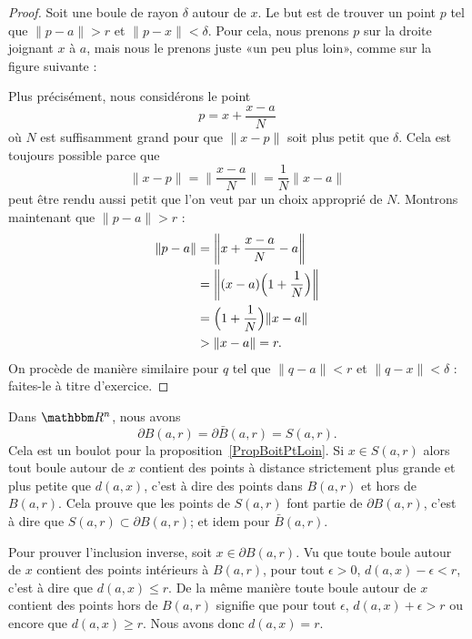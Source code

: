 \begin{proof}
	Soit une boule de rayon $\delta$ autour de $x$. Le but est de trouver un point $p$ tel que $\|p - a \|>r$ et $\|p - x \|<\delta$. Pour cela, nous prenons $p$ sur la droite joignant $x$ à $a$, mais nous le prenons juste «un peu plus loin», comme sur la figure suivante :

    \begin{center}
       
    \end{center}

   Plus précisément, nous considérons le point
	\begin{equation}
		p = x+\frac{ x - a }{ N }
	\end{equation}
	où \( N \) est suffisamment grand pour que \( \|x - p \| \) soit plus petit que \(\delta\). Cela est toujours possible parce que
	\begin{equation}
          \|x - p \| =  \biggl\|\frac {x - a} N \biggr\| = \frac 1 N \| x - a \|
	\end{equation}
	peut être rendu aussi petit que l'on veut par un choix approprié de \( N \). Montrons maintenant que \( \| p - a \| > r \) :
	\begin{align}
          \| p - a \| &= \biggl \| x + \frac{ x - a }{ N } - a \biggr\|\\
                      &= \biggl \| (x - a) \Bigl ( 1  + \frac 1 { N } \Bigr ) \biggr\|\\
                      &=\Bigl ( 1  + \frac 1 { N } \Bigr ) \| x - a \|\\
                      &>\| x - a \| = r.\\
	\end{align}
	On procède de manière similaire pour \( q \) tel que \(\|q - a\| < r\) et \(\| q - x \|<\delta \) : faites-le à titre d'exercice.
\end{proof}

\begin{remark}
	Dans $\eR^n$, nous avons
	\begin{equation}
		\partial B(a,r)=\partial\bar B(a,r)=S(a,r).
	\end{equation}
    Cela est un boulot pour la proposition~\ref{PropBoitPtLoin}. Si \( x\in S(a,r)\) alors tout boule autour de \( x\) contient des points à distance strictement plus grande et plus petite que \( d(a,x)\), c'est à dire des points dans \( B(a,r)\) et hors de \( B(a,r)\). Cela prouve que les points de \( S(a,r)\) font partie de \( \partial B(a,r)\), c'est à dire que \( S(a,r)\subset \partial B(a,r)\); et idem pour \( \bar B(a,r)\).

Pour prouver l'inclusion inverse, soit \( x\in \partial B(a,r)\). Vu que toute boule autour de \( x\) contient des points intérieurs à \( B(a,r)\), pour tout \( \epsilon>0\), \( d(a,x)-\epsilon< r \), c'est à dire que \( d(a,x)\leq r\). De la même manière toute boule autour de \( x\) contient des points hors de \( B(a,r)\) signifie que pour tout \( \epsilon\), \( d(a,x)+\epsilon>r\) ou encore que \( d(a,x)\geq r\). Nous avons donc \( d(a,x)=r\).
\end{remark}
